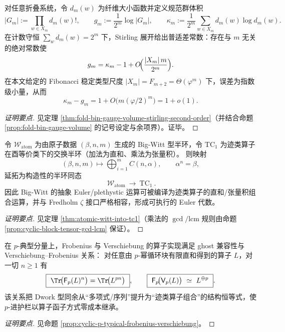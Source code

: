 \begin{conclusion}\label{con:xi-fold-gauge-volume-codim1-constant}
对任意折叠系统，令 \(d_m(w)\) 为纤维大小函数并定义规范群体积
\[
|G_m|:=\prod_{w\in X_m} d_m(w)!,
\qquad
g_m:=\frac{1}{2^m}\log|G_m|,
\qquad
\kappa_m:=\frac{1}{2^m}\sum_{w\in X_m} d_m(w)\log d_m(w).
\]
在计数守恒 \(\sum_w d_m(w)=2^m\) 下，Stirling 展开给出普适差常数：存在与 \(m\) 无关的绝对常数使
\[
g_m=\kappa_m-1+O\!\Bigl(\frac{|X_m|\,m}{2^m}\Bigr).
\]
在本文给定的 Fibonacci 稳定类型尺度 \(|X_m|=F_{m+2}=\Theta(\varphi^m)\) 下，误差为指数级小量，从而
\[
\kappa_m-g_m=1+O\!\bigl(m(\varphi/2)^m\bigr)=1+o(1).
\]
\end{conclusion}
\begin{proof}[证明要点]
见定理 \ref{thm:fold-bin-gauge-volume-stirling-second-order}（并结合命题 \ref{prop:fold-bin-gauge-volume} 的记号设定与余项界）。证毕。
\end{proof}

\begin{conclusion}\label{con:xi-atomic-witt-operator-compilation}
令 \(\mathcal{W}_{\mathrm{atom}}\) 为由原子数据 \((\beta,n,m)\) 生成的 Big-Witt 型半环，令 \(\mathrm{TC}_1\) 为迹类算子在酉等价类下的交换半环（加法为直和、乘法为张量积）。
则映射
\[
(\beta,n,m)\longmapsto \bigoplus_{i=1}^{m} C(n,\alpha),\qquad \alpha^n=\beta,
\]
延拓为构造性的半环同态
\[
\boxed{\ \mathcal{W}_{\mathrm{atom}}\ \longrightarrow\ \mathrm{TC}_1\ }.
\]
因此 Big-Witt 的抽象 Euler/plethystic 运算可被编译为迹类算子的直和/张量积组合运算，并与 Fredholm \(\zeta\) 接口严格相容，形成可执行的 Euler 代数。
\end{conclusion}
\begin{proof}[证明要点]
见定理 \ref{thm:atomic-witt-into-tc1}（乘法的 \(\gcd/\mathrm{lcm}\) 规则由命题 \ref{prop:cyclic-block-tensor-gcd-lcm} 保证）。
\end{proof}

\begin{conclusion}\label{con:xi-ptypical-frobenius-verschiebung-trace}
在 \(p\)-典型分量上，Frobenius 与 Verschiebung 的算子实现满足 ghost 兼容性与 Verschiebung--Frobenius 关系：
对任意由 \(p\)-幂循环块有限直和得到的算子 \(L\)，对一切 \(n\ge 1\) 有
\[
\boxed{\ \Tr\!\bigl(\mathsf F_p(L)^n\bigr)=\Tr\!\bigl(L^{pn}\bigr)\ },
\qquad
\boxed{\ \mathsf F_p\!\bigl(\mathsf V_p(L)\bigr)\ \simeq\ L^{\oplus p}\ }.
\]
该关系把 Dwork 型同余从“多项式/序列”提升为“迹类算子组合”的结构恒等式，使 \(p\)-进护栏以算子函子方式零成本继承。
\end{conclusion}
\begin{proof}[证明要点]
见命题 \ref{prop:cyclic-p-typical-frobenius-verschiebung}。
\end{proof}

